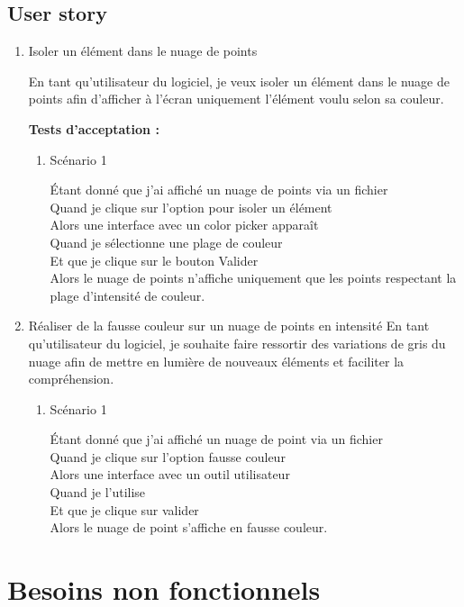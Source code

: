 \documentclass[12pt,titlepage,french]{article}
\begin{document}
\subsection*{User story}

\begin{enumerate}
    \item Isoler un élément dans le nuage de points
    
En tant qu'utilisateur du logiciel, je veux isoler un élément dans le nuage de points afin d'afficher à l'écran uniquement l'élément voulu selon sa couleur.

\textbf{Tests d'acceptation :}

\begin{enumerate}
    \item Scénario 1
    
Étant donné que j'ai affiché un nuage de points via un fichier\\
Quand je clique sur l'option pour isoler un élément\\
Alors une interface avec un color picker apparaît\\
Quand je sélectionne une plage de couleur\\
Et que je clique sur le bouton Valider\\
Alors le nuage de points n'affiche uniquement que les points respectant la plage d'intensité de couleur.


\end{enumerate}
\item Réaliser de la fausse couleur sur un nuage de points en intensité
En tant qu'utilisateur du logiciel, je souhaite faire ressortir des variations de gris du nuage afin de mettre en lumière de nouveaux éléments et faciliter la compréhension.
\begin{enumerate}
    \item Scénario 1
    
Étant donné que j'ai affiché un nuage de point via un fichier\\
Quand je clique sur l'option fausse couleur\\
Alors une interface avec un outil utilisateur\\
Quand je l'utilise\\
Et que je clique sur valider\\
Alors le nuage de point s'affiche en fausse couleur.
\end{enumerate}
\end{enumerate}


\section{Besoins non fonctionnels}
\end{document}
